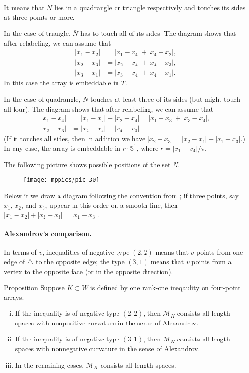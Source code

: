 \documentclass[a4paper,10pt]{article}
\begin{document}
It means that $\bar N$ lies in a quadrangle or triangle respectively and touches its sides at three points or more.

In the case of triangle, $\bar N$ has to touch all of its sides.
The diagram shows that after relabeling, we can assume that 
\begin{align*}
|x_1-x_2|&=|x_1-x_4|+|x_4-x_2|,
\\
|x_2-x_3|&=|x_2-x_4|+|x_4-x_3|,
\\
|x_3-x_1|&=|x_3-x_4|+|x_4-x_1|.
\end{align*}
In this case the array is embeddable in $T$.

In the case of quadrangle, $\bar N$ touches at least three of its sides (but might touch all four).
The diagram shows that after relabeling, we can assume that 
\begin{align*}
|x_1-x_4|&=|x_1-x_2|+|x_2-x_4|=|x_1-x_3|+|x_3-x_4|,
\\
|x_2-x_3|&=|x_2-x_4|+|x_4-x_3|.
\end{align*}
(If it touches all sides, then in addition we have $|x_2-x_3|=|x_2-x_1|+|x_1-x_3|$.)
In any case, the array is embeddable in $r\cdot \mathbb{S}^1$, where $r=|x_1-x_4|/\pi$.
\qeds

The following picture shows possible positions of the set $N$.
\begin{figure}[h!]
\centering
\vskip-0mm
\texttt{[image: mppics/pic-30]}
\vskip-0mm
\end{figure}
Below it we draw a diagram following the convention from \cite{lebedeva-petrunin-2010};
if three points, say $x_1$, $x_2$, and $x_3$, uppear in this order on a smooth line, then $|x_1-x_2|+|x_2-x_3|=|x_1-x_3|$.


\paragraph{Alexandrov's comparison.}
In terms of $v$, inequalities of negative type $(2,2)$ means that $v$ points from one edge of $\triangle$ to the opposite edge;
the type $(3,1)$ means that $v$ points from a vertex to the opposite face (or in the opposite direction).

\begin{thm}{Proposition}
Suppose $K\subset W$ is defined by one rank-one ineqaulity on four-point arrays.
\begin{enumerate}[(i)]
\item If the inequality is of negative type $(2,2)$, then $\mathcal{M}_K$ consists all length spaces with nonpositive curvature in the sense of Alexandrov.
\item If the inequality is of negative type $(3,1)$, then $\mathcal{M}_K$ consists all length spaces with nonnegative curvature in the sense of Alexandrov.
\item In the remaining cases, $\mathcal{M}_K$ consists all length spaces.
\end{enumerate}

\end{thm}
\end{document}
